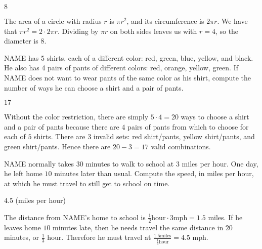 \documentclass[11pt]{article}
\begin{document}
\begin{answer}
$\boxed{8}$
\end{answer}

\begin{solution}
The area of a circle with radius $r$ is $\pi r^2$, and its circumference is $2\pi r$. We have that $\pi r^2 = 2 \cdot 2\pi r$. Dividing by $\pi r$ on both sides leaves us with $r = 4$, so the diameter is $\boxed{8}$.
\end{solution}


\begin{problem}
NAME has 5 shirts, each of a different color: red, green, blue, yellow, and black. He also has 4 pairs of pants of different colors: red, orange, yellow, green. If NAME does not want to wear pants of the same color as his shirt, compute the number of ways he can choose a shirt and a pair of pants.
\end{problem}

\begin{answer}
$\boxed{17}$
\end{answer}

\begin{solution}
Without the color restriction, there are simply $5 \cdot 4 = 20$ ways to choose a shirt and a pair of pants because there are $4$ pairs of pants from which to choose for each of $5$ shirts. There are $3$ invalid sets: red shirt/pants, yellow shirt/pants, and green shirt/pants. Hence there are $20 - 3 = \boxed{17}$ valid combinations.
\end{solution}


\begin{problem}
NAME normally takes $30$ minutes to walk to school at $3$ miles per hour. One day, he left home $10$ minutes later than usual. Compute the speed, in miles per hour, at which he must travel to still get to school on time.
\end{problem}

\begin{answer}
$\boxed{4.5}$ (miles per hour)
\end{answer}

\begin{solution}
The distance from NAME's home to school is $\frac{1}{2} \text{hour} \cdot 3 \text{mph} = 1.5$ miles. If he leaves home $10$ minutes late, then he needs travel the same distance in $20$ minutes, or $\frac{1}{3}$ hour. Therefore he must travel at $\frac{1.5 \text{miles}}{\frac{1}{3} \text{hour}} = \boxed{4.5}$ mph.
\end{solution}
\end{document}
